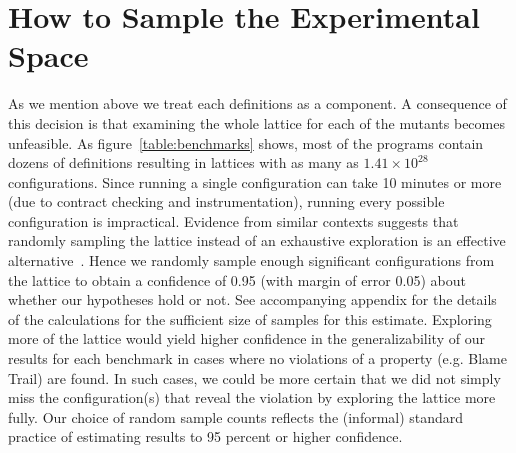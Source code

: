 \section{How to Sample the Experimental Space} \label{sec:sample}

As we mention above we treat each definitions as a component. A
consequence of this decision is that examining the whole lattice
for each of the mutants becomes unfeasible.
As figure~\ref{table:benchmarks} shows,  most of the programs contain dozens of definitions  
resulting in lattices with as many as $1.41 \times 10^{28}$ configurations.
Since running a single configuration can take 10 minutes or more 
(due to contract checking and instrumentation), running every possible configuration is impractical.
Evidence from similar contexts suggests that randomly sampling the lattice instead of
an exhaustive exploration is an effective alternative~\cite{greenman2019evaluate}.
Hence we randomly sample enough significant configurations
from the lattice to obtain a confidence of 0.95 (with margin of error
0.05) about whether our hypotheses hold or not.
See accompanying appendix for the details of the calculations for the
sufficient size of samples for this estimate.
Exploring more of the lattice would yield higher confidence in the generalizability
of our results for each benchmark in cases where no violations of a property
(e.g. Blame Trail) are found.
In such cases, we could be more certain that we did not simply miss
the configuration(s) that reveal the violation by exploring the lattice more fully.
Our choice of random sample counts reflects the (informal) standard practice of estimating
results to 95 percent or higher confidence.
